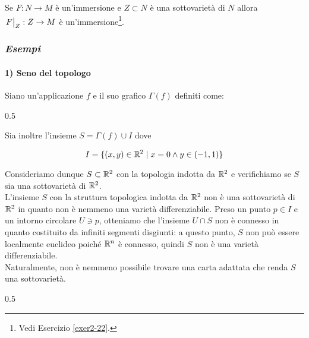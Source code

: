 \begin{remark}
	Se $ F : N \to M $ è un'immersione e $ Z \subset N $ è una sottovarietà di $ N $ allora $ \eval{F}_{Z} : Z \to M $ è un'immersione\footnote{%
		Vedi Esercizio \ref{exer2-22}.%
	}.
\end{remark}

\subsubsection{\textit{Esempi}}

\paragraph{1) Seno del topologo}

Siano un'applicazione $ f $ e il suo grafico $ \Gamma(f) $ definiti come:

	{0.5}{%
			}

Sia inoltre l'insieme $ S = \Gamma(f) \cup I $ dove

\begin{equation}
	I = \{ (x,y) \in \mathbb{R}^{2} \mid x=0 \wedge y \in (-1,1) \}
\end{equation}

Consideriamo dunque $ S \subset \mathbb{R}^{2} $ con la topologia indotta da $ \mathbb{R}^{2} $ e verifichiamo se $ S $ sia una sottovarietà di $ \mathbb{R}^{2} $. \\
L'insieme $ S $ con la struttura topologica indotta da $ \mathbb{R}^{2} $ non è una sottovarietà di $ \mathbb{R}^{2} $ in quanto non è nemmeno una varietà differenziabile. Preso un punto $ p \in I $ e un intorno circolare $ U \ni p $, otteniamo che l'insieme $ U \cap S $ non è connesso in quanto costituito da infiniti segmenti disgiunti: a questo punto, $ S $ non può essere localmente euclideo poiché $ \mathbb{R}^{n} $ è connesso, quindi $ S $ non è una varietà differenziabile. \\
Naturalmente, non è nemmeno possibile trovare una carta adattata che renda $ S $ una sottovarietà.

	{0.5}{%
			}

